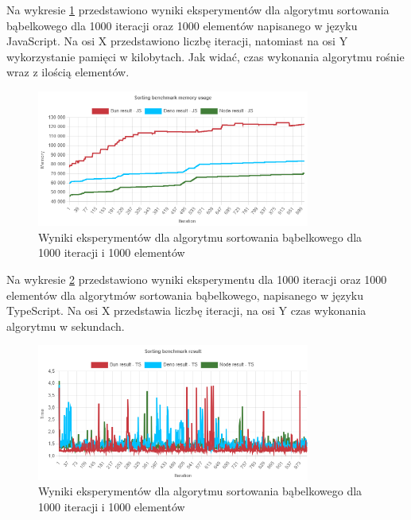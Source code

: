 Na wykresie \ref{fig:bubble_sorting_e3_memory_js} przedstawiono wyniki eksperymentów dla algorytmu sortowania bąbelkowego dla 1000 iteracji oraz 1000 elementów napisanego w języku JavaScript. Na osi X przedstawiono liczbę iteracji, natomiast na osi Y wykorzystanie pamięci w kilobytach. Jak widać, czas wykonania algorytmu rośnie wraz z ilością elementów.
\begin{figure}[H]
  \centering
  \includegraphics[width=0.8\textwidth]{Figures/sorting/bubble/e3_memory_js.png}
  \caption{Wyniki eksperymentów dla algorytmu sortowania bąbelkowego dla 1000 iteracji i 1000 elementów}
  \label{fig:bubble_sorting_e3_memory_js}
\end{figure}

Na wykresie \ref{fig:bubble_sorting_e3_ts} przedstawiono wyniki eksperymentu dla 1000 iteracji oraz 1000 elementów dla algorytmów sortowania bąbelkowego, napisanego w języku TypeScript. Na osi X przedstawia liczbę iteracji, na osi Y czas wykonania algorytmu w sekundach. 

\begin{figure}[H]
  \centering
  \includegraphics[width=0.8\textwidth]{Figures/sorting/bubble/e3_ts.png}
  \caption{Wyniki eksperymentów dla algorytmu sortowania bąbelkowego dla 1000 iteracji i 1000 elementów}
  \label{fig:bubble_sorting_e3_ts}
\end{figure}

